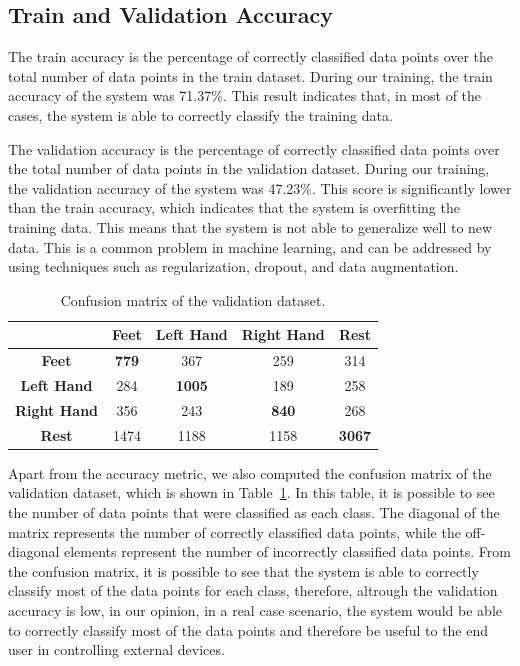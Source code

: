 \subsection*{Train and Validation Accuracy}
The train accuracy is the percentage of correctly classified data points over the total number of data points in the train dataset.
During our training, the train accuracy of the system was 71.37\%.
This result indicates that, in most of the cases, the system is able to correctly classify the training data.

The validation accuracy is the percentage of correctly classified data points over the total number of data points in the validation dataset.
During our training, the validation accuracy of the system was 47.23\%.
This score is significantly lower than the train accuracy, which indicates that the system is overfitting the training data.
This means that the system is not able to generalize well to new data.
This is a common problem in machine learning, and can be addressed by using techniques such as regularization, dropout, and data augmentation.

\begin{table}[!htbp]
    \centering
    \begin{tabular}{|c||c|c|c|c|}
        \hline
        & \textbf{Feet} & \textbf{Left Hand} & \textbf{Right Hand} & \textbf{Rest} \\
        \hline
        \hline
        \textbf{Feet} & \textbf{779} & 367 & 259 & 314 \\
        \hline
        \textbf{Left Hand} & 284 & \textbf{1005} & 189 & 258 \\
        \hline
        \textbf{Right Hand} & 356 & 243 & \textbf{840} & 268 \\
        \hline
        \textbf{Rest} & 1474 & 1188 & 1158 & \textbf{3067} \\
        \hline
    \end{tabular}
    \caption{Confusion matrix of the validation dataset.}\label{tab:confusion_matrix}
\end{table}

Apart from the accuracy metric, we also computed the confusion matrix of the validation dataset, which is shown in Table~\ref{tab:confusion_matrix}.
In this table, it is possible to see the number of data points that were classified as each class.
The diagonal of the matrix represents the number of correctly classified data points, while the off-diagonal elements represent the number of incorrectly classified data points.
From the confusion matrix, it is possible to see that the system is able to correctly classify most of the data points for each class, therefore, altrough the validation accuracy is low, in our opinion, in a real case scenario, the system would be able to correctly classify most of the data points and therefore be useful to the end user in controlling external devices.

